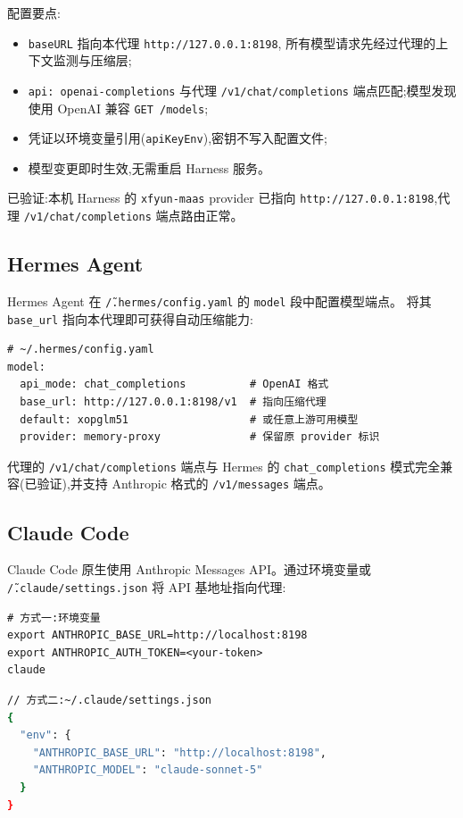 \documentclass[11pt,a4paper]{article}
\begin{document}
配置要点:
\begin{itemize}
  \item \texttt{baseURL} 指向本代理 \texttt{http://127.0.0.1:8198},
        所有模型请求先经过代理的上下文监测与压缩层;
  \item \texttt{api: openai-completions} 与代理 \texttt{/v1/chat/completions}
        端点匹配;模型发现使用 OpenAI 兼容 \texttt{GET /models};
  \item 凭证以环境变量引用(\texttt{apiKeyEnv}),密钥不写入配置文件;
  \item 模型变更即时生效,无需重启 Harness 服务。
\end{itemize}

已验证:本机 Harness 的 \texttt{xfyun-maas} provider 已指向
\texttt{http://127.0.0.1:8198},代理 \texttt{/v1/chat/completions} 端点路由正常。

\subsection{Hermes Agent}

Hermes Agent 在 \texttt{\~/.hermes/config.yaml} 的 \texttt{model} 段中配置模型端点。
将其 \texttt{base\_url} 指向本代理即可获得自动压缩能力:

\begin{lstlisting}[language={}]
# ~/.hermes/config.yaml
model:
  api_mode: chat_completions          # OpenAI 格式
  base_url: http://127.0.0.1:8198/v1  # 指向压缩代理
  default: xopglm51                   # 或任意上游可用模型
  provider: memory-proxy              # 保留原 provider 标识
\end{lstlisting}

代理的 \texttt{/v1/chat/completions} 端点与 Hermes 的 \texttt{chat\_completions}
模式完全兼容(已验证),并支持 Anthropic 格式的 \texttt{/v1/messages} 端点。

\subsection{Claude Code}

Claude Code 原生使用 Anthropic Messages API。通过环境变量或
\texttt{\~/.claude/settings.json} 将 API 基地址指向代理:

\begin{lstlisting}
# 方式一:环境变量
export ANTHROPIC_BASE_URL=http://localhost:8198
export ANTHROPIC_AUTH_TOKEN=<your-token>
claude
\end{lstlisting}

\begin{lstlisting}[language=bash]
// 方式二:~/.claude/settings.json
{
  "env": {
    "ANTHROPIC_BASE_URL": "http://localhost:8198",
    "ANTHROPIC_MODEL": "claude-sonnet-5"
  }
}
\end{lstlisting}
\end{document}
